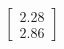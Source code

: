 \documentclass[preview]{standalone}
\begin{document}
\begin{align*}
\begin{bmatrix} 2.28 \\ 2.86 \end{bmatrix}
\end{align*}
\end{document}
